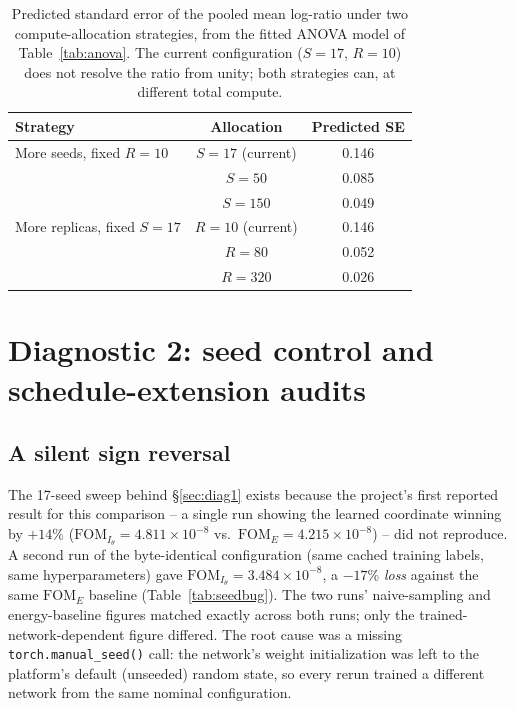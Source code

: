 \documentclass[a4paper,fleqn]{cas-sc}
\newcommand{\FOM}{\mathrm{FOM}}
\begin{document}
\begin{table}[h]
\centering
\caption{Predicted standard error of the pooled mean log-ratio under two
compute-allocation strategies, from the fitted ANOVA model of
Table~\ref{tab:anova}. The current configuration ($S=17$, $R=10$) does not
resolve the ratio from unity; both strategies can, at different total
compute.}
\label{tab:allocation}
\begin{tabular}{lcc}
\toprule
Strategy & Allocation & Predicted SE \\
\midrule
More seeds, fixed $R=10$ & $S=17$ (current) & 0.146 \\
 & $S=50$ & 0.085 \\
 & $S=150$ & 0.049 \\
More replicas, fixed $S=17$ & $R=10$ (current) & 0.146 \\
 & $R=80$ & 0.052 \\
 & $R=320$ & 0.026 \\
\bottomrule
\end{tabular}
\end{table}

\FloatBarrier

\section{Diagnostic 2: seed control and schedule-extension audits}\label{sec:diag2}

\subsection{A silent sign reversal}

The 17-seed sweep behind \S\ref{sec:diag1} exists because the project's
first reported result for this comparison -- a single run showing the
learned coordinate winning by $+14\%$ ($\FOM_{I_\theta}=4.811\times10^{-8}$
vs.\ $\FOM_E = 4.215\times10^{-8}$) -- did not reproduce. A second run of the
byte-identical configuration (same cached training labels, same
hyperparameters) gave $\FOM_{I_\theta} = 3.484\times10^{-8}$, a $-17\%$
\emph{loss} against the same $\FOM_E$ baseline (Table~\ref{tab:seedbug}).
The two runs' naive-sampling and energy-baseline figures matched exactly
across both runs; only the trained-network-dependent figure differed. The
root cause was a missing \texttt{torch.manual\_seed()} call: the network's
weight initialization was left to the platform's default (unseeded) random
state, so every rerun trained a different network from the same nominal
configuration.
\end{document}
